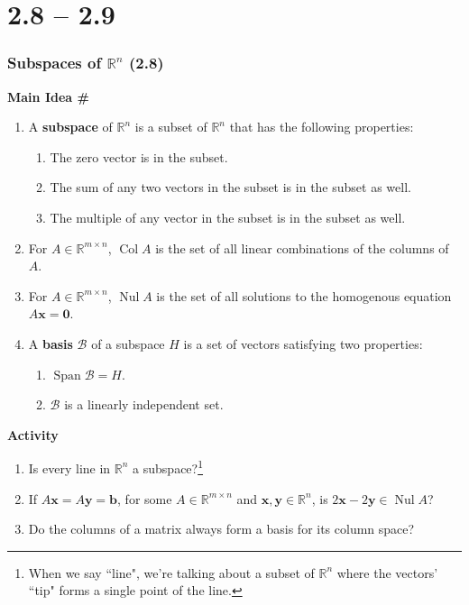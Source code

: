 \documentclass[titlepage, a4paper, 10pt]{article}
\renewcommand{\vec}[1]{\mathbf{#1}}
\DeclareMathOperator{\vspan}{Span}
\DeclareMathOperator{\colspace}{Col}
\DeclareMathOperator{\nullspace}{Nul}
\newcounter{mainideas}
\newcommand{\mainidea}{\textbf{Main Idea \#\themainideas \stepcounter{mainideas}}}
\newenvironment{mideea}[1]
{%
\begin{lrbox}{\mybox}%
	\begin{minipage}{#1\textwidth}
		{\centering \mainidea \par}

}
{\end{minipage}\end{lrbox}\begin{center}\fbox{\usebox{\mybox}}\end{center}}
\newcounter{activity}
\newenvironment{newactivity}
{
	\noindent\textbf{Activity \theactivity}
}
{
\stepcounter{activity}
\par
}
\begin{document}
\part{2.8 -- 2.9}
\section{\centering Subspaces of \(\mathbb{R}^n\) (2.8)}
\begin{mideea}{0.9}
	\begin{enumerate}
		\item A \textbf{subspace} of \(\mathbb{R}^n\) is a subset of \(\mathbb{R}^n\) that has the following properties:
			\begin{enumerate}
				\item The zero vector is in the subset.
				\item The sum of any two vectors in the subset is in the subset as well.
				\item The multiple of any vector in the subset is in the subset as well.
			\end{enumerate}
		\item For \(A \in \mathbb{R}^{m \times n}\), \(\colspace A\) is the set of all linear combinations of the columns of \(A\). 
		\item For \(A \in \mathbb{R}^{m \times n}\), \(\nullspace A\) is the set of all solutions to the homogenous equation \(A \vec{x} = \vec{0}\).
		\item A \textbf{basis} \(\mathcal{B}\) of a subspace \(H\) is a set of vectors satisfying two properties:
			\begin{enumerate}
				\item \(\vspan \mathcal{B} = H\).
				\item \(\mathcal{B}\) is a linearly independent set.
			\end{enumerate}
	\end{enumerate}
\end{mideea}

\begin{newactivity}
	\begin{enumerate}
		\item Is every line in \(\mathbb{R}^n\) a subspace?\footnote{When we say ``line", we're talking about a subset of \(\mathbb{R}^n\) where the 
			vectors' ``tip" forms a single point of the line.}
		\item If \(A \vec{x} = A \vec{y} = \vec{b}\), for some \(A \in \mathbb{R}^{m \times n}\) and \(\vec{x}, \vec{y} \in \mathbb{R}^{n}\), is 
			\(2\vec{x} - 2\vec{y} \in \nullspace A\)?
		\item Do the columns of a matrix always form a basis for its column space?
	\end{enumerate}
\end{newactivity}
\end{document}
